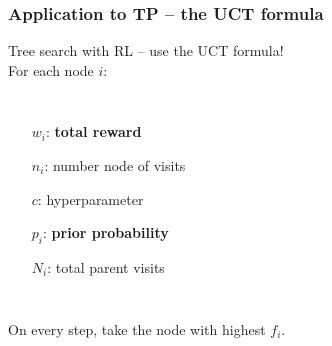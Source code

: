 \documentclass{beamer}
\begin{document}
\begin{frame}
    \frametitle{Application to TP -- the UCT formula}
    Tree search with RL -- use the UCT formula!\\
    For each node $i$:
    \begin{columns}
        \centering
    \begin{itemize}
        \small
        \item[$w_i$:] \textbf{total reward}
        \item[$n_i$:] number node of visits
        \item[$c$:] hyperparameter
        \item[$p_i$:] \textbf{prior probability}
        \item[$N_i$:] total parent visits
    \end{itemize}
    \end{columns}

    On every step, take the node with highest $f_i$.
\end{frame}
\end{document}
